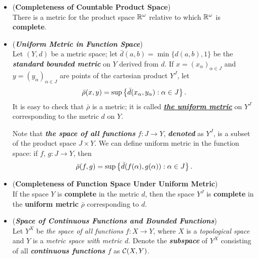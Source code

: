 \documentclass[11pt]{article}
\begin{document}
\begin{itemize}
\item \begin{proposition} (\textbf{Completeness of Countable Product Space}) \citep{munkres2000topology} \\
There is a metric for the product space ${\mathbb R}^{\omega}$ relative to which ${\mathbb R}^{\omega}$ is \textbf{complete}.
\end{proposition}

\item \begin{definition} (\emph{\textbf{Uniform Metric in Function Space}})\\
Let $(Y, d)$ be a metric space; let $\bar{d}(a, b) = \min\{d(a, b), 1\}$ be the \emph{\textbf{standard bounded metric}} on $Y$ derived from $d$. If $x = (x_{\alpha})_{\alpha \in J}$ and  $y = (y_{\alpha})_{\alpha \in J}$ are points of the cartesian product $Y^J$, let
\begin{align*}
\bar{\rho}(x, y) = \sup\left\{\bar{d}(x_{\alpha}, y_{\alpha}): \alpha \in J\right\}.
\end{align*}
It is easy to check that $\bar{\rho}$ is a metric; it is called \underline{\emph{\textbf{the uniform metric}}} on $Y^J$ corresponding to the metric $d$ on $Y$.

Note that \emph{\textbf{the space of all functions} $f: J \rightarrow Y$}, \emph{\textbf{denoted}} as $Y^{J}$, is a subset of the product space $J \times Y$. We can define uniform metric in the function space: if $f$, $g : J \rightarrow Y$, then
\begin{align*}
\bar{\rho}(f, g) = \sup\left\{\bar{d}(f(\alpha), g(\alpha)): \alpha \in J\right\}.
\end{align*}
\end{definition}

\item \begin{proposition} (\textbf{Completeness of Function Space  Under Uniform Metric}) \citep{munkres2000topology} \\
If the space $Y$ is \textbf{complete} in the metric $d$, then the space $Y^J$ is \textbf{complete} in the \textbf{uniform metric} $\bar{\rho}$ corresponding to $d$.
\end{proposition}

\item \begin{definition} (\emph{\textbf{Space of Continuous Functions and Bounded Functions}})\\
Let $Y^{X}$ be  \emph{the space of all functions} $f: X \rightarrow Y$, where $X$ is a \emph{topological space} and $Y$ is a \emph{metric space with metric $d$}. Denote the \emph{\textbf{subspace}}  of $Y^X$ consisting of all \emph{\textbf{continuous functions} $f$} as ${\mathcal C}(X, Y)$. 


\end{definition}
\end{itemize}
\end{document}
